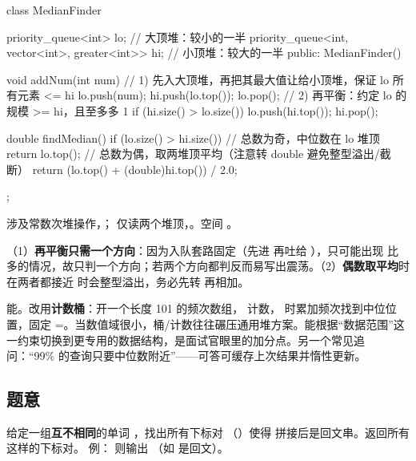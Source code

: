 \begin{cpp}
class MedianFinder {
    priority_queue<int> lo;                              // 大顶堆：较小的一半
    priority_queue<int, vector<int>, greater<int>> hi;   // 小顶堆：较大的一半
public:
    MedianFinder() {}

    void addNum(int num) {
        // 1) 先入大顶堆，再把其最大值让给小顶堆，保证 lo 所有元素 <= hi
        lo.push(num);
        hi.push(lo.top());
        lo.pop();
        // 2) 再平衡：约定 lo 的规模 >= hi，且至多多 1
        if (hi.size() > lo.size()) {
            lo.push(hi.top());
            hi.pop();
        }
    }

    double findMedian() {
        if (lo.size() > hi.size())        // 总数为奇，中位数在 lo 堆顶
            return lo.top();
        // 总数为偶，取两堆顶平均（注意转 double 避免整型溢出/截断）
        return (lo.top() + (double)hi.top()) / 2.0;
    }
};
\end{cpp}

\begin{keypoint}[复杂度]
 涉及常数次堆操作，； 仅读两个堆顶，。空间 。
\end{keypoint}

\begin{pitfall}[平衡方向与求和溢出]
（1）\textbf{再平衡只需一个方向}：因为入队套路固定（先进  再吐给 ），只可能出现  比  多的情况，故只判一个方向；若两个方向都判反而易写出震荡。（2）\textbf{偶数取平均}时  在两者都接近  时会整型溢出，务必先转  再相加。
\end{pitfall}

\begin{followup}
能。改用\textbf{计数桶}：开一个长度 101 的频次数组，  计数， 时累加频次找到中位位置，固定 =。当数值域很小，桶/计数往往碾压通用堆方案。能根据“数据范围”这一约束切换到更专用的数据结构，是面试官眼里的加分点。另一个常见追问：“99\% 的查询只要中位数附近”——可答可缓存上次结果并惰性更新。
\end{followup}


\subsection*{题意}
给定一组\textbf{互不相同}的单词 ，找出所有下标对 （）使得  拼接后是回文串。返回所有这样的下标对。
例： 则输出 \code{[[0,1],[1,0],[3,2],[2,4]]}（如  是回文）。


